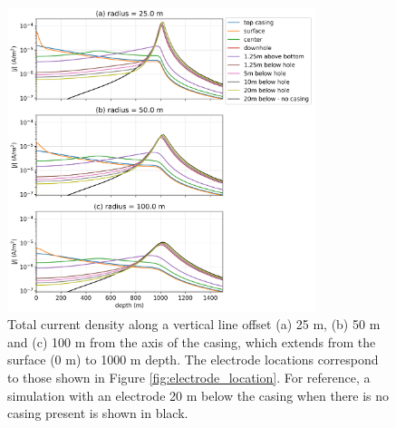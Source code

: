 \begin{figure}
    \begin{center}
    \includegraphics[width=0.8\textwidth]{figures/dc_casing/electrode_location_currents.png}
    \end{center}
\caption{
    Total current density along a vertical line offset (a) 25 m, (b) 50 m and (c) 100 m
    from the axis of the casing, which extends
    from the surface (0 m) to 1000 m depth.
    The electrode locations correspond to those shown in Figure \ref{fig:electrode_location}.
    For reference, a simulation with an electrode 20 m below the casing when there is no casing present
    is shown in black.
}
\label{fig:electrode_location_currents}
\end{figure}

